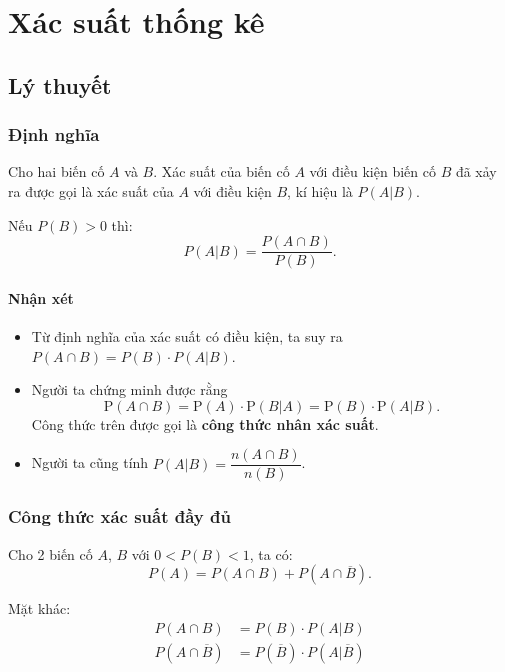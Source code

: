\documentclass[twoside,final]{hcmut-report}
\begin{document}
\coverpage\clearpage
\tableofcontents
\clearpage

\fancyfoot{}

\setcounter{page}{1}
\section{Xác suất thống kê}
\subsection{Lý thuyết}
\subsubsection{Định nghĩa}
Cho hai biến cố $A$ và $B$. Xác suất của biến cố $A$ với điều kiện biến cố $B$ đã xảy ra được gọi là xác suất của $A$ với điều kiện $B$, kí hiệu là $P(A | B)$.

Nếu $P(B) > 0$ thì:
\[
    P(A | B) = \frac{P(A \cap B)}{P(B)}.
\]
\paragraph*{Nhận xét}
\begin{itemize}[itemsep=0pt, topsep=0pt, parsep=0pt,label=-]
    \item Từ định nghĩa của xác suất có điều kiện, ta suy ra $P(A \cap B) = P(B) \cdot P(A | B)$.
    \item Người ta chứng minh được rằng
          \[
              \mathrm{P}(A \cap B) = \mathrm{P}(A) \cdot \mathrm{P}(B | A) = \mathrm{P}(B) \cdot \mathrm{P}(A | B).
          \]
          Công thức trên được gọi là \textbf{công thức nhân xác suất}.
    \item Người ta cũng tính $P(A | B) = \dfrac{n(A \cap B)}{n(B)}$.
\end{itemize}
\subsubsection{Công thức xác suất đầy đủ}
Cho 2 biến cố $A$, $B$ với $0 < P(B) < 1$, ta có:
\[
    P(A) = P(A \cap B) + P(A \cap \overline{B}).
\]

Mặt khác:
\begin{align*}
    P(A \cap B)            & = P(B) \cdot P(A | B)                       \\
    P(A \cap \overline{B}) & = P(\overline{B}) \cdot P(A | \overline{B})
\end{align*}
\end{document}
